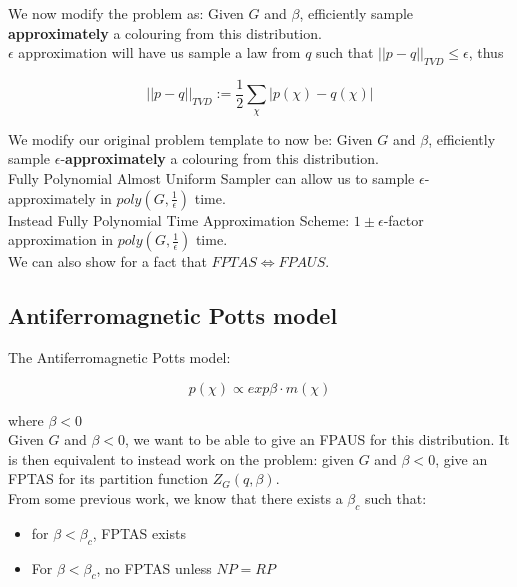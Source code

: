 \documentclass{article}
\begin{document}
\noindent We now modify the problem as: Given $G$ and $\beta$, efficiently sample \textbf{approximately} a colouring from this distribution.\\

\noindent $\epsilon$ approximation will have us sample a law from $q$ such that $||p-q||_{TVD} \leq \epsilon$, thus

\begin{equation}
    ||p-q||_{TVD} := \frac{1}{2} \sum_{\chi} |p(\chi) - q(\chi)|
\end{equation}

\noindent We modify our original problem template to now be: Given $G$ and $\beta$, efficiently sample $\epsilon$-\textbf{approximately} a colouring from this distribution.\\

\noindent Fully Polynomial Almost Uniform Sampler can allow us to sample $\epsilon$-approximately in $poly(G,\frac{1}{\epsilon})$ time.\\

\noindent Instead Fully Polynomial Time Approximation Scheme: $1 \pm \epsilon$-factor approximation in $poly(G,\frac{1}{\epsilon})$ time.\\

\noindent We can also show for a fact that $FPTAS \iff FPAUS$.

\subsection{Antiferromagnetic Potts model}

\noindent The Antiferromagnetic Potts model:

\begin{equation}    
p(\chi) \propto exp{\beta \cdot m(\chi)}
\end{equation}

\noindent where $\beta < 0$\\

\noindent Given $G$ and $\beta < 0$, we want to be able to give an FPAUS for this distribution. It is then equivalent to instead work on the problem: given $G$ and $\beta < 0$, give an FPTAS for its partition function $Z_G(q, \beta)$.\\

\noindent From some previous work, we know that there exists a $\beta_c$ such that:

\begin{itemize}
    \item for $\beta < \beta_c$, FPTAS exists 
    \item For $\beta < \beta_c$, no FPTAS unless $NP = RP$
\end{itemize}
\end{document}

